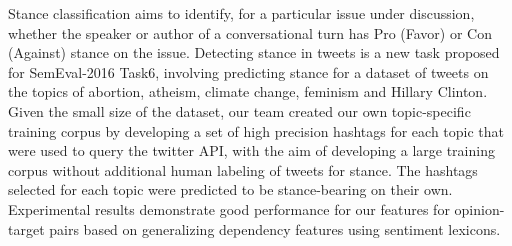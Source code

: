 Stance classification aims to identify, for a particular issue under discussion, whether the speaker or author of a conversational turn has Pro (Favor) or Con (Against) stance on the issue. Detecting stance in tweets is a new task proposed for SemEval-2016 Task6, involving predicting stance for a dataset of tweets on the topics of abortion, atheism, climate change, feminism and Hillary Clinton. Given the small size of the dataset, our team created our own topic-specific training corpus by developing a set of high precision hashtags for each topic that were used to query the twitter API, with the aim of developing a large training corpus without additional human labeling of tweets for stance. The hashtags selected for each topic were predicted to be stance-bearing on their own. Experimental results demonstrate good performance for our features for opinion-target pairs based on generalizing dependency features using sentiment lexicons.
